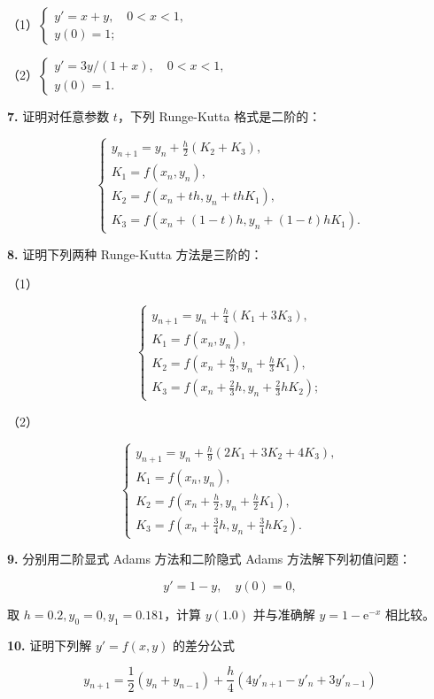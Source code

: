 \documentclass[
  10pt,
  fontset=fandol]{ctexart}
\begin{document}
（1）\(\begin{cases}y'=x+y,\quad0<x<1,\\y(0)=1;\end{cases}\)

（2）\(\begin{cases}y'=3y/(1+x),\quad0<x<1,\\y(0)=1.\end{cases}\)

\textbf{7.} 证明对任意参数 \(t\)，下列 Runge-Kutta 格式是二阶的：

\[
\begin{cases}
\displaystyle y_{n+1}=y_n+\frac h2(K_2+K_3),\\[6pt]
K_1=f(x_n,y_n),\\
K_2=f(x_n+th,y_n+thK_1),\\
K_3=f(x_n+(1-t)h,y_n+(1-t)hK_1).
\end{cases}
\]

\textbf{8.} 证明下列两种 Runge-Kutta 方法是三阶的：

（1）

\[
\begin{cases}
\displaystyle y_{n+1}=y_n+\frac h4(K_1+3K_3),\\[6pt]
K_1=f(x_n,y_n),\\
\displaystyle K_2=f\left(x_n+\frac h3,y_n+\frac h3K_1\right),\\[4pt]
\displaystyle K_3=f\left(x_n+\frac23h,y_n+\frac23hK_2\right);
\end{cases}
\]

（2）

\[
\begin{cases}
\displaystyle y_{n+1}=y_n+\frac h9(2K_1+3K_2+4K_3),\\[6pt]
K_1=f(x_n,y_n),\\
\displaystyle K_2=f\left(x_n+\frac h2,y_n+\frac h2K_1\right),\\[4pt]
\displaystyle K_3=f\left(x_n+\frac34h,y_n+\frac34hK_2\right).
\end{cases}
\]

\textbf{9.} 分别用二阶显式 Adams 方法和二阶隐式 Adams 方法解下列初值问题：

\[
y'=1-y,\quad y(0)=0,
\]

取 \(h=0.2,y_0=0,y_1=0.181\)，计算 \(y(1.0)\) 并与准确解 \(y=1-\mathrm e^{-x}\) 相比较。

\textbf{10.} 证明下列解 \(y'=f(x,y)\) 的差分公式

\[
y_{n+1}=\frac12(y_n+y_{n-1})+\frac h4(4y'_{n+1}-y'_n+3y'_{n-1})
\]
\end{document}
